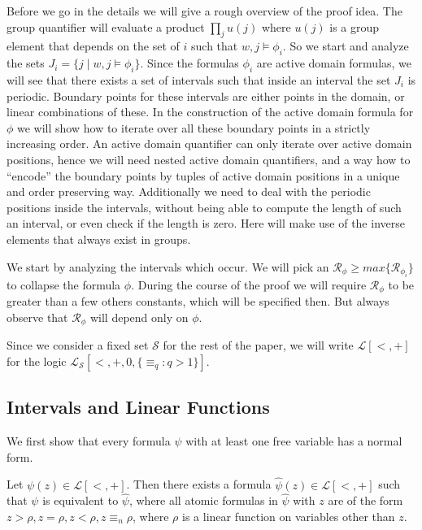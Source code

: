 \documentclass[envcountsame]{llncs}
\begin{document}
Before we go in the details we will give a rough overview of the proof idea.
The group quantifier will evaluate a product $\prod_j u(j)$ where $u(j)$ is a group element that depends on the set of $i$ such that $w,j\models\phi_i$. So we start and analyze the sets $J_i=\{j\mid w,j\models\phi_i\}$. Since the formulas $\phi_i$ are active domain formulas, we will see that there exists a set of intervals such that inside an interval the set $J_i$ is periodic. Boundary points for these intervals are either points in the domain, or linear combinations of these. 
In the construction of the active domain formula for $\phi$ we will show how to iterate over all these boundary points in a strictly increasing order. An active domain quantifier can only iterate over active domain positions, hence we will need nested active domain quantifiers, and a way how to ``encode'' the boundary points by tuples of active domain positions in a unique and order preserving way. Additionally we need to deal with the periodic positions inside the intervals, without being able to compute the length of such an interval, or even check if the length is zero. Here will make use of the inverse elements that always exist in groups.
 
We start by analyzing the intervals which occur.
We will pick an $\mathcal{R}_{\phi} \geq max \{ \mathcal{R}_{\phi_i} \}$ to collapse the formula $\phi$. During the course of the proof we will require $\mathcal{R}_{\phi}$
 to be greater than a few others constants, which will be specified then. But always observe that $\mathcal{R}_{\phi}$ will depend only on $\phi$.


Since we consider a fixed set $\mathcal S$ for the rest of the paper, we will write $\mathcal{L}[<,+]$ for the logic $\mathcal{L_S}[<,+,0,\{\equiv_q:q>1\}]$.

\subsection{Intervals and Linear Functions} \label{linFunc}
We first show that every formula $\psi$ with at least one free variable has a normal form.
\begin{lemma}
 \label{lem_normalform}
Let $\psi(z) \in \mathcal{L}[<,+]$. Then there exists a formula $\hat \psi(z) \in \mathcal{L}[<,+]$ such that $\psi$ is equivalent to $\hat \psi$, where all 
atomic formulas in $\hat \psi$ with $z$ are of the form $z > \rho, z = \rho, z< \rho, z \equiv_n \rho$, where $\rho$ is a linear function on variables other than $z$.
 \end{lemma}
\end{document}
